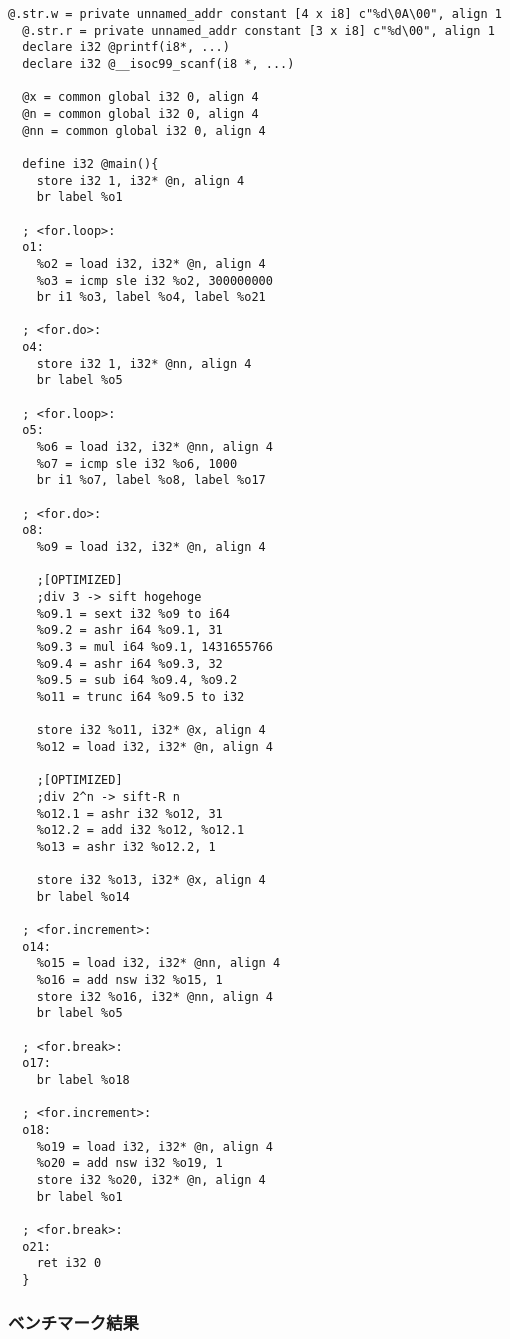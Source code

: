 \begin{lstlisting}[caption={コンパイル結果},label={コンパイル結果}]@.str.w = private unnamed_addr constant [4 x i8] c"%d\0A\00", align 1
  @.str.r = private unnamed_addr constant [3 x i8] c"%d\00", align 1
  declare i32 @printf(i8*, ...)
  declare i32 @__isoc99_scanf(i8 *, ...)
  
  @x = common global i32 0, align 4
  @n = common global i32 0, align 4
  @nn = common global i32 0, align 4
  
  define i32 @main(){
    store i32 1, i32* @n, align 4
    br label %o1
  
  ; <for.loop>:
  o1:
    %o2 = load i32, i32* @n, align 4
    %o3 = icmp sle i32 %o2, 300000000
    br i1 %o3, label %o4, label %o21
  
  ; <for.do>:
  o4:
    store i32 1, i32* @nn, align 4
    br label %o5
  
  ; <for.loop>:
  o5:
    %o6 = load i32, i32* @nn, align 4
    %o7 = icmp sle i32 %o6, 1000
    br i1 %o7, label %o8, label %o17
  
  ; <for.do>:
  o8:
    %o9 = load i32, i32* @n, align 4
  
    ;[OPTIMIZED]
    ;div 3 -> sift hogehoge
    %o9.1 = sext i32 %o9 to i64
    %o9.2 = ashr i64 %o9.1, 31
    %o9.3 = mul i64 %o9.1, 1431655766
    %o9.4 = ashr i64 %o9.3, 32
    %o9.5 = sub i64 %o9.4, %o9.2
    %o11 = trunc i64 %o9.5 to i32
  
    store i32 %o11, i32* @x, align 4
    %o12 = load i32, i32* @n, align 4
  
    ;[OPTIMIZED]
    ;div 2^n -> sift-R n
    %o12.1 = ashr i32 %o12, 31
    %o12.2 = add i32 %o12, %o12.1
    %o13 = ashr i32 %o12.2, 1
  
    store i32 %o13, i32* @x, align 4
    br label %o14
  
  ; <for.increment>:
  o14:
    %o15 = load i32, i32* @nn, align 4
    %o16 = add nsw i32 %o15, 1
    store i32 %o16, i32* @nn, align 4
    br label %o5
  
  ; <for.break>:
  o17:
    br label %o18
  
  ; <for.increment>:
  o18:
    %o19 = load i32, i32* @n, align 4
    %o20 = add nsw i32 %o19, 1
    store i32 %o20, i32* @n, align 4
    br label %o1
  
  ; <for.break>:
  o21:
    ret i32 0
  }  
\end{lstlisting}

\subsubsection{ベンチマーク結果}



